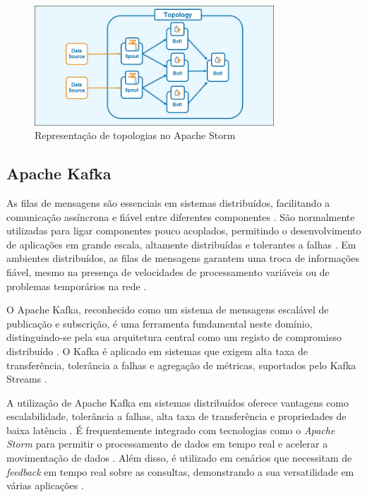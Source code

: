\begin{figure}[H]
    \centering
    \includegraphics[width=0.8\textwidth]{media/content/estado-arte/apache-storm-topology-diagram.png}
    \caption{Representação de topologias no Apache Storm \cite{storm-arch}}
    \label{fig:topologies}
\end{figure}

\subsection{Apache Kafka}
\label{sec:kafka}

As filas de mensagens são essenciais em sistemas distribuídos, facilitando a comunicação assíncrona
e fiável entre diferentes componentes \cite{kafka2015}. São normalmente utilizadas para ligar
componentes pouco acoplados, permitindo o desenvolvimento de aplicações em grande escala, altamente
distribuídas e tolerantes a falhas \cite{kafka2011}. Em ambientes distribuídos, as filas de 
mensagens garantem uma troca de informações fiável, mesmo na presença de velocidades de 
processamento variáveis ou de problemas temporários na rede \cite{kafka2015}.

O Apache Kafka, reconhecido como um sistema de mensagens escalável de publicação e subscrição, é
uma ferramenta fundamental neste domínio, distinguindo-se pela sua arquitetura central como um 
registo de compromisso distribuído \cite{kafka2015b}. O Kafka é aplicado em sistemas que 
exigem alta taxa de transferência, tolerância a falhas e agregação de métricas, suportados pelo 
Kafka Streams \cite{kafka2020}.

A utilização de Apache Kafka em sistemas distribuídos oferece vantagens como escalabilidade,
tolerância a falhas, alta taxa de transferência e propriedades de baixa latência 
\cite{kafka2017}. É frequentemente integrado com tecnologias como o \textit{Apache Storm} para 
permitir o processamento de dados em tempo real e acelerar a movimentação de dados \cite{kafka2016}. 
Além disso, é utilizado em cenários que necessitam de \textit{feedback} em tempo real sobre as 
consultas, demonstrando a sua versatilidade em várias aplicações \cite{kafka2023}.

